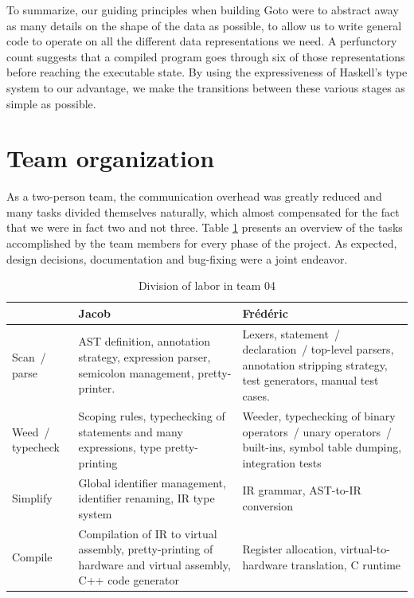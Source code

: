 \documentclass[letterpaper,11pt]{article}
\begin{document}
To summarize, our guiding principles when building Goto were to abstract away as many details on the shape of the data as possible, to allow us to write general code to operate on all the different data representations we need. A perfunctory count suggests that a compiled program goes through six of those representations before reaching the executable state. By using the expressiveness of Haskell's type system to our advantage, we make the transitions between these various stages as simple as possible.

\section{Team organization}
\label{sec:org}

As a two-person team, the communication overhead was greatly reduced and many tasks divided themselves naturally, which almost compensated for the fact that we were in fact two and not three. Table \ref{tab:dol} presents an overview of the tasks accomplished by the team members for every phase of the project. As expected, design decisions, documentation and bug-fixing were a joint endeavor.

\begin{table}
	\begin{tabular}{|l|p{15em}|p{15em}|}
	\hline
	& \textbf{Jacob} & \textbf{Fr\'ed\'eric} \\
	\hline
	Scan~/ parse & AST definition, annotation strategy, expression parser, semicolon management, pretty-printer. & Lexers, statement~/ declaration~/ top-level parsers, annotation stripping strategy, test generators, manual test cases. \\
	\hline
	Weed~/ typecheck & Scoping rules, typechecking of statements and many expressions, type pretty-printing & Weeder, typechecking of binary operators~/ unary operators~/ built-ins, symbol table dumping, integration tests \\
	\hline
	Simplify & Global identifier management, identifier renaming, IR type system & IR grammar, AST-to-IR conversion \\
	\hline
	Compile & Compilation of IR to virtual assembly, pretty-printing of hardware and virtual assembly, C++ code generator & Register allocation, virtual-to-hardware translation, C runtime \\
	\hline 
	\end{tabular}
	\caption{Division of labor in team 04}
	\label{tab:dol}
\end{table}
\end{document}
